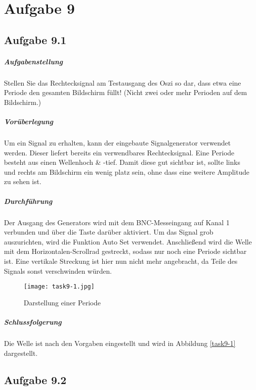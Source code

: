 \chapter{Aufgabe 9}
\section{Aufgabe 9.1}

\paragraph{Aufgabenstellung}
Stellen Sie das Rechtecksignal am Testausgang des Oszi so dar, dass etwa eine Periode den gesamten Bildschirm füllt! (Nicht zwei oder mehr Perioden auf dem Bildschirm.)

\paragraph{Vorüberlegung}
Um ein Signal zu erhalten, kann der eingebaute Signalgenerator verwendet werden. Dieser liefert bereits ein verwendbares Rechtecksignal. Eine Periode besteht aus einen Wellenhoch \& -tief. Damit diese gut sichtbar ist, sollte links und rechts am Bildschirm ein wenig platz sein, ohne dass eine weitere Amplitude zu sehen ist.

\paragraph{Durchführung}
Der Ausgang des Generators wird mit dem BNC-Messeingang auf Kanal 1 verbunden und über die Taste darüber aktiviert. Um das Signal grob auszurichten, wird die Funktion \glqq{}Auto Set\grqq{} verwendet. Anschließend wird die Welle mit dem Horizontalen-Scrollrad gestreckt, sodass nur noch eine Periode sichtbar ist. Eine vertikale Streckung ist hier nun nicht mehr angebracht, da Teile des Signals sonst verschwinden würden.

\begin{figure}
	\centering
	\texttt{[image: task9-1.jpg]}
	\caption{Darstellung einer Periode}
	\label{task9-1}
\end{figure}

\paragraph{Schlussfolgerung}
Die Welle ist nach den Vorgaben eingestellt und wird in Abbildung \vref{task9-1} dargestellt.

\section{Aufgabe 9.2}

